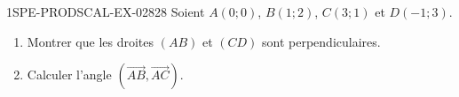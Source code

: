 \begin{exercice}{1SPE-PRODSCAL-EX-028}{2}{8}
Soient $A(0; 0)$, $B(1; 2)$, $C(3; 1)$ et $D(-1; 3)$.
\begin{enumerate}
  \item Montrer que les droites $(AB)$ et $(CD)$ sont perpendiculaires.
  \item Calculer l'angle $(\overrightarrow{AB}, \overrightarrow{AC})$.
\end{enumerate}
\end{exercice}
